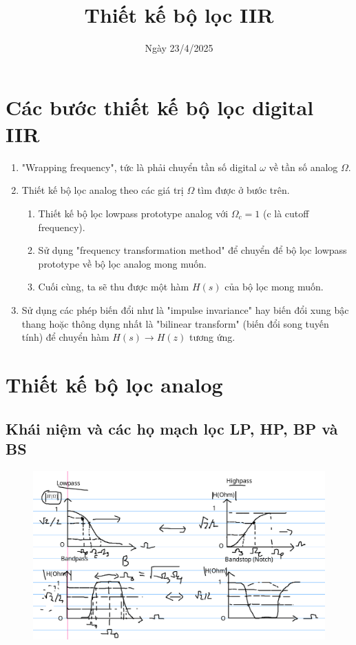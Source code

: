 \documentclass{article}
\title{Thiết kế bộ lọc IIR
}
\author{}
\date{Ngày 23/4/2025}
\begin{document}
\maketitle
\section{Các bước thiết kế bộ lọc digital IIR}
\begin{enumerate}
  \item "Wrapping frequency", tức là phải chuyển tần số digital $\omega$ về tần số analog $\Omega$.
  \item Thiết kế bộ lọc analog theo các giá trị $\Omega$ tìm được ở bước trên.
  \begin{enumerate}
    \item Thiết kế bộ lọc lowpass prototype analog với $\Omega_{c}=1$ (c là cutoff frequency).
    \item Sử dụng "frequency transformation method" để chuyển để bộ lọc lowpass prototype về bộ lọc analog mong muốn.
    \item Cuối cùng, ta sẽ thu được một hàm $H(s)$ của bộ lọc mong muốn.
  \end{enumerate}
  \item Sử dụng các phép biến đổi như là "impulse invariance" hay biến đổi xung bậc thang hoặc thông dụng nhất là "bilinear transform" (biến đổi song tuyến tính) để chuyển hàm $H(s)\to H(z)$ tương ứng.
\end{enumerate}
\section{Thiết kế bộ lọc analog}
\subsection{Khái niệm và các họ mạch lọc LP, HP, BP và BS}
\begin{figure}[h]
  \begin{center}
  \includegraphics[width=16cm]{iir.png}
  \end{center}
  \end{figure} 
\end{document}
